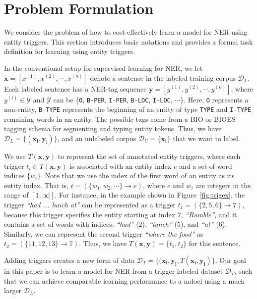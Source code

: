 \section{Problem Formulation}
We consider the problem of how to cost-effectively learn a model for NER using entity triggers. This section introduces basic notations and provides a formal task definition for learning using entity triggers.

In the conventional setup for supervised learning for NER, we let $\mathbf{x}=[x^{(1)}, x^{(2)}, \cdots, x^{(n)}]$ denote a sentence in the labeled training corpus $\mathcal{D}_{L}$.
Each labeled sentence has a NER-tag sequence $\textbf{y}=[y^{(1)}, y^{(2)}, \cdots, y^{(n)}]$, where $y^{(i)}\in \mathcal{Y}$ and  $\mathcal{Y}$ can be \{\texttt{O}, \texttt{B-PER}, \texttt{I-PER}, \texttt{B-LOC}, \texttt{I-LOC}, $\cdots$\}. Here, \texttt{O} represents a non-entity, \texttt{B-TYPE} represents the beginning of an entity of type \texttt{TYPE} and \texttt{I-TYPE} remaining words in an entity. The possible tags come from a BIO or BIOES tagging schema for segmenting and typing entity tokens.
Thus, we have $\mathcal{D}_{L}=\{(\mathbf{x_i}, \mathbf{y_i})\}$, and an unlabeled corpus $\mathcal{D}_{U}=\{\mathbf{x_i}\}$ that we want to label.

We use $T(\mathbf{x},\mathbf{y})$ to represent the set of annotated entity triggers, where each trigger $t_i\in T(\mathbf{x},\mathbf{y})$ is associated with an entity index $e$ and a set of word indices $\{w_i\}$.
Note that we use the index of the first word of an entity as its entity index.
That is, $t = (\{w_1, w_2, \cdots\}\rightarrow{e})$, where $e$ and $w_i$ are integers in the range of $[1,|\mathbf{x}|]$. \quad
For instance, in the example shown in Figure~\ref{fig:trigex}, the trigger \textit{``had ... lunch at''} can be represented as a trigger $t_1=(\{2,5,6\}\rightarrow{7})$, because this trigger specifies the entity starting at index $7$, \textit{``Rumble''}, and it contains a set of words with indices: \textit{``had''} ($2$), \textit{``lunch''} ($5$), and \textit{``at''} ($6$).
Similarly, we can represent the second trigger \textit{``where the food''} as $t_2 = (\{11,12,13\}\rightarrow{7})$.
Thus, we have $T(\mathbf{x},\mathbf{y})=\{t_1, t_2\}$ for this sentence.

Adding triggers creates a new form of data $\mathcal{D}_{T} = \{(\mathbf{x_i},\mathbf{y_i}, T(\mathbf{x_i},\mathbf{y_i})\}$. 
Our goal in this paper is to learn a model for NER from a trigger-labeled dataset $\mathcal{D}_T$, such that we can achieve comparable learning performance to a mdoel using a much larger $\mathcal{D}_L$.





